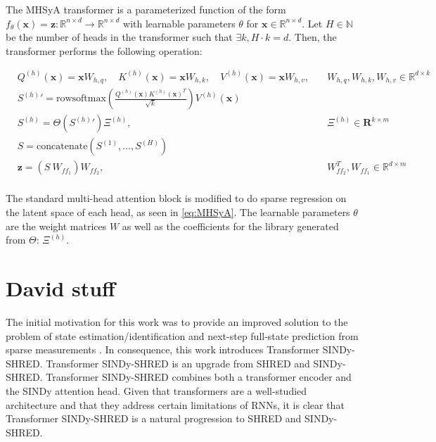 \documentclass[11pt, a4paper]{article}
\newcommand{\mbb}{\mathbb}
\newcommand{\mbf}{\mathbf}
\begin{document}
The MHSyA transformer is a parameterized function of the form $f_\theta (\mbf x) = \mbf z : \mbb R ^{n \times d} \rightarrow \mbb R ^{n \times d}$ with learnable parameters $\theta$ for $\mbf x \in \mbb R^{n \times d}$. Let $H \in \mathbb N$ be the number of heads in the transformer such that $\exists k, H \cdot k = d$. Then, the transformer performs the following operation:



\begin{align}
    & Q^{(h)}(\mathbf x) = \mathbf x W_{h,q}, \quad K^{(h)}(\mathbf x) = \mbf x W_{h,k}, \quad V^{(h)}(\mathbf x) = \mathbf x W_{h,v}, \quad & W_{h,q}, W_{h,k}, W_{h,v} \in \mbb R^{d \times k} \\
    & {S^{(h)}}' = \text{rowsoftmax} \left( \frac{Q^{(h)}(\mathbf x) {K^{(h)}}(\mathbf x)^T}{\sqrt{k}} \right) V^{(h)}(\mbf x) & \\
    & S^{(h)} = \Theta \left({S^{(h)}}' \right) \Xi^{(h)}, & \Xi^{(h)} \in \mathbf{R}^{k \times m} \label{eq:MHSyA} \\
    & S = \text{concatenate}(S^{(1)}, \ldots, S^{(H)}) &\\
    & \mbf z = (S\ W_{ff_1}) W_{ff_2}, & W_{ff_2}^T, W_{ff_1} \in \mbb R^{d \times m} \\
\end{align}

The standard multi-head attention block is modified to do sparse regression on the latent space of each head, as seen in \autoref{eq:MHSyA}. The learnable parameters $\theta$ are the weight matrices $W$ as well as the coefficients for the library generated from $\Theta$: $\Xi^{(h)}$.

\section{David stuff}

The initial motivation for this work was to provide an improved solution to the problem of state estimation/identification and next-step full-state prediction from sparse measurements \cite{williams2024sensingshallowrecurrentdecoder}. In consequence, this work introduces Transformer SINDy-SHRED. Transformer SINDy-SHRED is an upgrade from SHRED and SINDy-SHRED. Transformer SINDy-SHRED combines both a transformer encoder and the SINDy attention head. Given that transformers are a well-studied architecture and that they address certain limitations of RNNs, it is clear that Transformer SINDy-SHRED is a natural progression to SHRED and SINDy-SHRED. 
\end{document}
